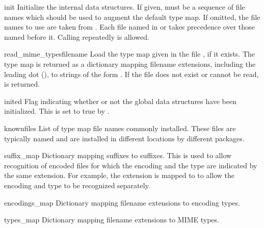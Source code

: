 \begin{funcdesc}{init}{}
Initialize the internal data structures.  If given,  must
be a sequence of file names which should be used to augment the
default type map.  If omitted, the file names to use are taken from
.  Each file named in  or
 takes precedence over those named before it.
Calling  repeatedly is allowed.
\end{funcdesc}

\begin{funcdesc}{read_mime_types}{filename}
Load the type map given in the file , if it exists.  The 
type map is returned as a dictionary mapping filename extensions,
including the leading dot (), to strings of the form
.  If the file  does
not exist or cannot be read,  is returned.
\end{funcdesc}


\begin{datadesc}{inited}
Flag indicating whether or not the global data structures have been
initialized.  This is set to true by .
\end{datadesc}

\begin{datadesc}{knownfiles}
List of type map file names commonly installed.  These files are
typically named  and are installed in different
locations by different packages.
\end{datadesc}

\begin{datadesc}{suffix_map}
Dictionary mapping suffixes to suffixes.  This is used to allow
recognition of encoded files for which the encoding and the type are
indicated by the same extension.  For example, the 
extension is mapped to  to allow the encoding and type
to be recognized separately.
\end{datadesc}

\begin{datadesc}{encodings_map}
Dictionary mapping filename extensions to encoding types.
\end{datadesc}

\begin{datadesc}{types_map}
Dictionary mapping filename extensions to MIME types.
\end{datadesc}
